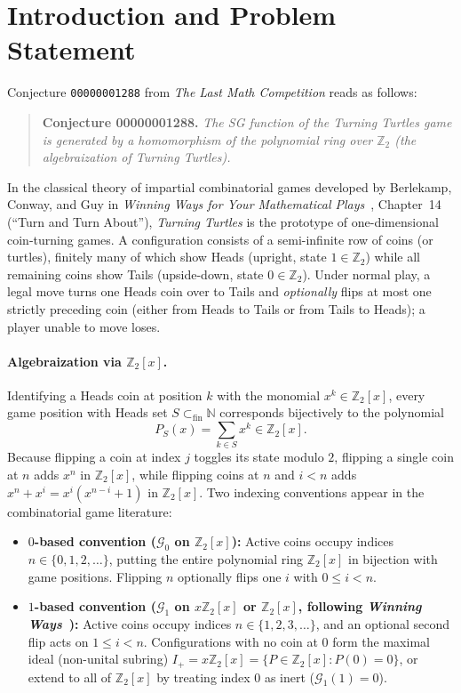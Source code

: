 \documentclass[11pt,a4paper]{article}
\theoremstyle{definition}
\newcommand{\Z}{\mathbb{Z}}
\newcommand{\N}{\mathbb{N}}
\newcommand{\SG}{\mathcal{G}}
\begin{document}
\section{Introduction and Problem Statement}

Conjecture \texttt{00000001288} from \emph{The Last Math Competition} reads as follows:

\begin{quote}
\textbf{Conjecture 00000001288.} \emph{The SG function of the Turning Turtles game is
generated by a homomorphism of the polynomial ring over $\Z_2$ (the algebraization of
Turning Turtles).}
\end{quote}

In the classical theory of impartial combinatorial games developed by Berlekamp, Conway,
and Guy in \emph{Winning Ways for Your Mathematical Plays}~\cite{WW}, Chapter~14
(``Turn and Turn About''), \emph{Turning Turtles} is the prototype of one-dimensional
coin-turning games. A configuration consists of a semi-infinite row of coins (or turtles),
finitely many of which show Heads (upright, state $1 \in \Z_2$) while all remaining coins
show Tails (upside-down, state $0 \in \Z_2$). Under normal play, a legal move turns one
Heads coin over to Tails and \emph{optionally} flips at most one strictly preceding coin
(either from Heads to Tails or from Tails to Heads); a player unable to move loses.

\paragraph{Algebraization via $\Z_2[x]$.}
Identifying a Heads coin at position $k$ with the monomial $x^k \in \Z_2[x]$, every game
position with Heads set $S \subset_{\mathrm{fin}} \N$ corresponds bijectively to the
polynomial
\[
  P_S(x) = \sum_{k \in S} x^k \in \Z_2[x].
\]
Because flipping a coin at index $j$ toggles its state modulo $2$, flipping a single coin
at $n$ adds $x^n$ in $\Z_2[x]$, while flipping coins at $n$ and $i < n$ adds
$x^n + x^i = x^i(x^{n-i} + 1)$ in $\Z_2[x]$. Two indexing conventions appear in the
combinatorial game literature:
\begin{itemize}
  \setlength{\itemsep}{2pt}
  \item \textbf{$0$-based convention ($\SG_0$ on $\Z_2[x]$):} Active coins occupy indices
    $n \in \{0,1,2,\dots\}$, putting the entire polynomial ring $\Z_2[x]$ in bijection
    with game positions. Flipping $n$ optionally flips one $i$ with $0 \le i < n$.
  \item \textbf{$1$-based convention ($\SG_1$ on $x\Z_2[x]$ or $\Z_2[x]$, following
    \emph{Winning Ways}~\cite{WW}):} Active coins occupy indices $n \in \{1,2,3,\dots\}$,
    and an optional second flip acts on $1 \le i < n$. Configurations with no coin at $0$
    form the maximal ideal (non-unital subring) $I_+ = x\Z_2[x] = \{P \in \Z_2[x] : P(0)=0\}$,
    or extend to all of $\Z_2[x]$ by treating index $0$ as inert ($\SG_1(1)=0$).
\end{itemize}
\end{document}
